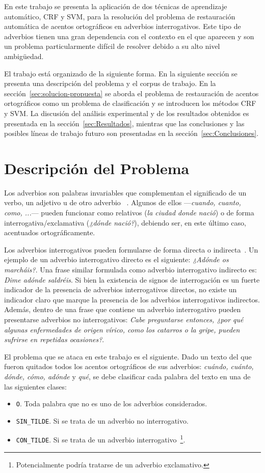 \documentclass[runningheads,a4paper]{llncs}
\begin{document}
En este trabajo se presenta la aplicación de dos técnicas de aprendizaje automático, CRF y SVM, para la resolución del problema de restauración automática de acentos ortográficos en adverbios interrogativos. Este tipo de adverbios tienen una gran dependencia con el contexto en el que aparecen y son un problema particularmente difícil de resolver debido a su alto nivel ambigüedad.

El trabajo está organizado de la siguiente forma. En la siguiente sección se presenta una descripción del problema y el corpus de trabajo. En la sección~\ref{sec:solucion-propuesta} se aborda el problema de restauración de acentos ortográficos como un problema de clasificación y se introducen los métodos CRF y SVM. La discusión del análisis experimental y de los resultados obtenidos es presentada en la sección~\ref{sec:Resultados}, mientras que las conclusiones y las posibles líneas de trabajo futuro son presentadas en la sección~\ref{sec:Conclusiones}.

\section{Descripción del Problema}
Los adverbios son palabras invariables que complementan el significado de un verbo, un adjetivo u de otro adverbio ~\cite{RAE}. Algunos de ellos ---\emph{cuando, cuanto, como, ...}--- pueden funcionar como relativos (\emph{la ciudad donde nació}) o de forma interrogativa/exclamativa (\emph{¿dónde nació?}), debiendo ser, en este último caso,  acentuados ortográficamente. 

Los adverbios interrogativos pueden formularse de forma directa o indirecta~\cite{VECIANA04}. Un ejemplo de un adverbio interrogativo directo es el siguiente: \emph{¿Adónde os marcháis?}. Una frase similar formulada como adverbio interrogativo indirecto es: \emph{Dime adónde saldréis}. Si bien la existencia de signos de interrogación es un fuerte indicador de la presencia de adverbios interrogativos directos, no existe un indicador claro que marque la presencia de los adverbios interrogativos indirectos. Además, dentro de una frase que contiene un adverbio interrogativo pueden presentarse adverbios no interrogativos: \emph{Cabe preguntarse entonces, ¿por qué algunas enfermedades de origen vírico, como los catarros o la gripe, pueden sufrirse en repetidas ocasiones?}.

El problema que se ataca en este trabajo es el siguiente. Dado un texto del que fueron quitados todos los acentos ortográficos de sus adverbios: \emph{cuándo, cuánto, dónde, cómo, adónde} y \emph{qué}, se debe clasificar cada palabra del texto en una de las siguientes clases: 
\begin{itemize}
	\item {\texttt{O}}. Toda palabra que no es uno de los adverbios considerados.
	\item {\texttt{SIN\_TILDE}}. Si se trata de un adverbio no interrogativo.
	\item {\texttt{CON\_TILDE}}. Si se trata de un adverbio interrogativo~\footnote{Potencialmente podr\'ia tratarse de un adverbio exclamativo.}.
\end{itemize}
\end{document}
